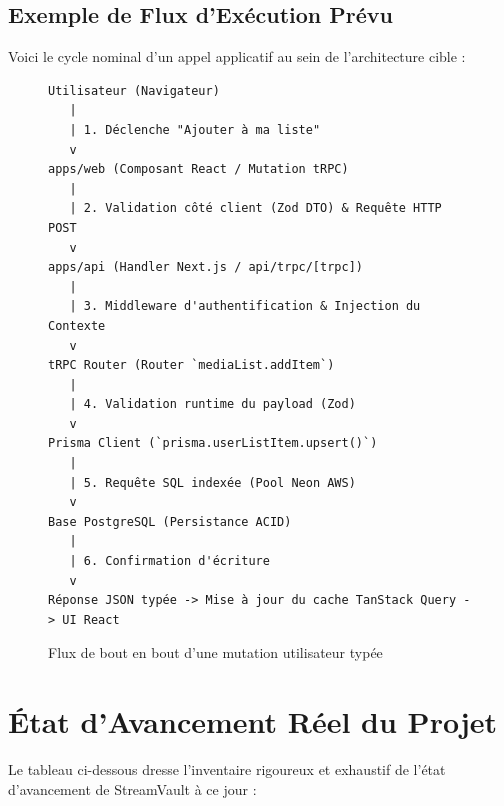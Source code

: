 \documentclass[11pt,a4paper]{article}
\begin{document}
\subsection{Exemple de Flux d'Exécution Prévu}
Voici le cycle nominal d'un appel applicatif au sein de l'architecture cible :

\begin{figure}[htbp]
\centering
\begin{verbatim}
Utilisateur (Navigateur)
   |
   | 1. Déclenche "Ajouter à ma liste"
   v
apps/web (Composant React / Mutation tRPC)
   |
   | 2. Validation côté client (Zod DTO) & Requête HTTP POST
   v
apps/api (Handler Next.js / api/trpc/[trpc])
   |
   | 3. Middleware d'authentification & Injection du Contexte
   v
tRPC Router (Router `mediaList.addItem`)
   |
   | 4. Validation runtime du payload (Zod)
   v
Prisma Client (`prisma.userListItem.upsert()`)
   |
   | 5. Requête SQL indexée (Pool Neon AWS)
   v
Base PostgreSQL (Persistance ACID)
   |
   | 6. Confirmation d'écriture
   v
Réponse JSON typée -> Mise à jour du cache TanStack Query -> UI React
\end{verbatim}
\caption{Flux de bout en bout d'une mutation utilisateur typée}
\end{figure}

\section{État d'Avancement Réel du Projet}

Le tableau ci-dessous dresse l'inventaire rigoureux et exhaustif de l'état d'avancement de StreamVault à ce jour :
\end{document}
